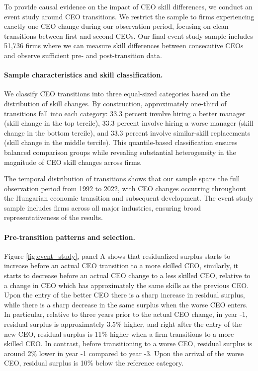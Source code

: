 \documentclass[11pt,a4paper]{article}
\begin{document}
To provide causal evidence on the impact of CEO skill differences, we conduct an event study around CEO transitions. We restrict the sample to firms experiencing exactly one CEO change during our observation period, focusing on clean transitions between first and second CEOs. Our final event study sample includes 51,736 firms where we can measure skill differences between consecutive CEOs and observe sufficient pre- and post-transition data.

\paragraph{Sample characteristics and skill classification.} We classify CEO transitions into three equal-sized categories based on the distribution of skill changes. By construction, approximately one-third of transitions fall into each category: 33.3 percent involve hiring a better manager (skill change in the top tercile), 33.3 percent involve hiring a worse manager (skill change in the bottom tercile), and 33.3 percent involve similar-skill replacements (skill change in the middle tercile). This quantile-based classification ensures balanced comparison groups while revealing substantial heterogeneity in the magnitude of CEO skill changes across firms.

The temporal distribution of transitions shows that our sample spans the full observation period from 1992 to 2022, with CEO changes occurring throughout the Hungarian economic transition and subsequent development. The event study sample includes firms across all major industries, ensuring broad representativeness of the results.

\paragraph{Pre-transition patterns and selection.} Figure \ref{fig:event_study}, panel A shows that residualized surplus starts to increase before an actual CEO transition to a more skilled CEO, similarly, it starts to decrease before an actual CEO change to a less skilled CEO, relative to a change in CEO which has approximately the same skills as the previous CEO. Upon the entry of the better CEO there is a sharp increase in residual surplus, while there is a sharp decrease in the same surplus when the worse CEO enters. In particular, relative to three years prior to the actual CEO change, in year -1, residual surplus is approximately 3.5\% higher, and right after the entry of the new CEO, residual surplus is 11\% higher when a firm transitions to a more skilled CEO. In contrast, before transitioning to a worse CEO, residual surplus is around 2\% lower in year -1 compared to year -3. Upon the arrival of the worse CEO, residual surplus is 10\% below the reference category.
\end{document}
